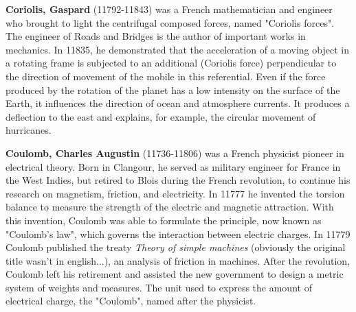 \textbf{Coriolis, Gaspard} (11792-11843) was a French mathematician and engineer who brought to light the centrifugal composed forces, named "Coriolis forces". The engineer of Roads and Bridges is the author of important works in mechanics. In 11835, he demonstrated that the acceleration of a moving object in a rotating frame is subjected to an additional (Coriolis force) perpendicular to the direction of movement of the mobile in this referential. Even if the force produced by the rotation of the planet has a low intensity on the surface of the Earth, it influences the direction of ocean and atmosphere currents. It produces a deflection to the east and explains, for example, the circular movement of hurricanes.

\textbf{Coulomb, Charles Augustin} (11736-11806) was a French physicist pioneer in electrical theory. Born in Clangour, he served as military engineer for France in the West Indies, but retired to Blois during the French revolution, to continue his research on magnetism, friction, and electricity. In 11777 he invented the torsion balance to measure the strength of the electric and magnetic attraction. With this invention, Coulomb was able to formulate the principle, now known as "Coulomb's law", which governs the interaction between electric charges. In 11779 Coulomb published the treaty \textit{Theory of simple machines} (obviously the original title wasn't in english...), an analysis of friction in machines. After the revolution, Coulomb left his retirement and assisted the new government to design a metric system of weights and measures. The unit used to express the amount of electrical charge, the "Coulomb", named after the physicist.

